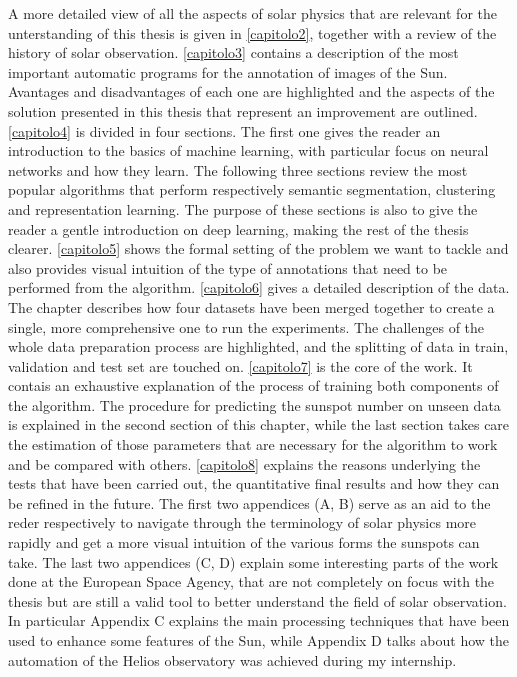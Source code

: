 \bigbreak
\noindent A more detailed view of all the aspects of solar physics that are relevant for the unterstanding of this thesis is given in \autoref{capitolo2}, together with a review of the history of solar observation.
\bigbreak
\noindent \autoref{capitolo3} contains a description of the most important automatic programs for the annotation of images of the Sun. Avantages and disadvantages of each one are highlighted and the aspects of the solution presented in this thesis that represent an improvement are outlined.
\bigbreak
\noindent \autoref{capitolo4} is divided in four sections. The first one gives the reader an introduction to the basics of machine learning, with particular focus on neural networks and how they learn. The following three sections review the most popular algorithms that perform respectively semantic segmentation, clustering and representation learning. The purpose of these sections is also to give the reader a gentle introduction on deep learning, making the rest of the thesis clearer.
\bigbreak
\noindent \autoref{capitolo5} shows the formal setting of the problem we want to tackle and also provides visual intuition of the type of annotations that need to be performed from the algorithm.
\bigbreak
\noindent \autoref{capitolo6} gives a detailed description of the data. The chapter describes how four datasets have been merged together to create a single, more comprehensive one to run the experiments. The challenges of the whole data preparation process are highlighted, and the splitting of data in train, validation and test set are touched on.
\bigbreak
\noindent \autoref{capitolo7} is the core of the work. It contais an exhaustive explanation of the process of training both components of the algorithm. The procedure for predicting the sunspot number on unseen data is explained in the second section of this chapter, while the last section takes care the estimation of those parameters that are necessary for the algorithm to work and be compared with others.
\bigbreak
\noindent \autoref{capitolo8} explains the reasons underlying the tests that have been carried out, the quantitative final results and how they can be refined in the future.
\bigbreak
\noindent The first two appendices (A, B) serve as an aid to the reder respectively to navigate through the terminology of solar physics more rapidly and get a more visual intuition of the various forms the sunspots can take.
\bigbreak
\noindent The last two appendices (C, D) explain some interesting parts of the work done at the European Space Agency, that are not completely on focus with the thesis but are still a valid tool to better understand the field of solar observation. In particular Appendix C explains the main processing techniques that have been used to enhance some features of the Sun, while Appendix D talks about how the automation of the Helios observatory was achieved during my internship.
